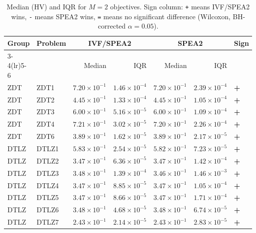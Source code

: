 \begin{table}[t]
\centering
\caption{Median (HV) and IQR for $M=2$ objectives. Sign column: \texttt{+} means IVF/SPEA2 wins, \texttt{-} means SPEA2 wins, \texttt{=} means no significant difference (Wilcoxon, BH-corrected $\alpha=0.05$).}
\label{tab:hv_m2_ivfspea2}
\scriptsize
\begin{tabular}{llrrrrl}
\toprule
Group & Problem & \multicolumn{2}{c}{IVF/SPEA2} & \multicolumn{2}{c}{SPEA2} & Sign \\
\cmidrule(lr){3-4}\cmidrule(lr){5-6}
 & & Median & IQR & Median & IQR & \\
\midrule
ZDT & ZDT1 & $7.20\!\times\!10^{-1}$ & $1.46\!\times\!10^{-4}$ & $7.20\!\times\!10^{-1}$ & $2.39\!\times\!10^{-4}$ & \textbf{+} \\
ZDT & ZDT2 & $4.45\!\times\!10^{-1}$ & $1.33\!\times\!10^{-4}$ & $4.45\!\times\!10^{-1}$ & $1.05\!\times\!10^{-4}$ & \textbf{+} \\
ZDT & ZDT3 & $6.00\!\times\!10^{-1}$ & $5.16\!\times\!10^{-5}$ & $6.00\!\times\!10^{-1}$ & $1.09\!\times\!10^{-4}$ & \textbf{+} \\
ZDT & ZDT4 & $7.21\!\times\!10^{-1}$ & $3.02\!\times\!10^{-5}$ & $7.20\!\times\!10^{-1}$ & $2.26\!\times\!10^{-4}$ & \textbf{+} \\
ZDT & ZDT6 & $3.89\!\times\!10^{-1}$ & $1.62\!\times\!10^{-5}$ & $3.89\!\times\!10^{-1}$ & $2.17\!\times\!10^{-5}$ & \textbf{+} \\
\addlinespace
DTLZ & DTLZ1 & $5.83\!\times\!10^{-1}$ & $2.54\!\times\!10^{-5}$ & $5.82\!\times\!10^{-1}$ & $7.23\!\times\!10^{-5}$ & \textbf{+} \\
DTLZ & DTLZ2 & $3.47\!\times\!10^{-1}$ & $6.36\!\times\!10^{-5}$ & $3.47\!\times\!10^{-1}$ & $1.42\!\times\!10^{-4}$ & \textbf{+} \\
DTLZ & DTLZ3 & $3.48\!\times\!10^{-1}$ & $1.39\!\times\!10^{-4}$ & $3.46\!\times\!10^{-1}$ & $1.46\!\times\!10^{-3}$ & \textbf{+} \\
DTLZ & DTLZ4 & $3.47\!\times\!10^{-1}$ & $8.85\!\times\!10^{-5}$ & $3.47\!\times\!10^{-1}$ & $1.05\!\times\!10^{-4}$ & \textbf{+} \\
DTLZ & DTLZ5 & $3.47\!\times\!10^{-1}$ & $8.66\!\times\!10^{-5}$ & $3.47\!\times\!10^{-1}$ & $1.71\!\times\!10^{-4}$ & \textbf{+} \\
DTLZ & DTLZ6 & $3.48\!\times\!10^{-1}$ & $4.68\!\times\!10^{-5}$ & $3.48\!\times\!10^{-1}$ & $6.74\!\times\!10^{-5}$ & \textbf{+} \\
DTLZ & DTLZ7 & $2.43\!\times\!10^{-1}$ & $2.14\!\times\!10^{-5}$ & $2.43\!\times\!10^{-1}$ & $2.83\!\times\!10^{-5}$ & \textbf{+} \\

\end{tabular}
\end{table}
